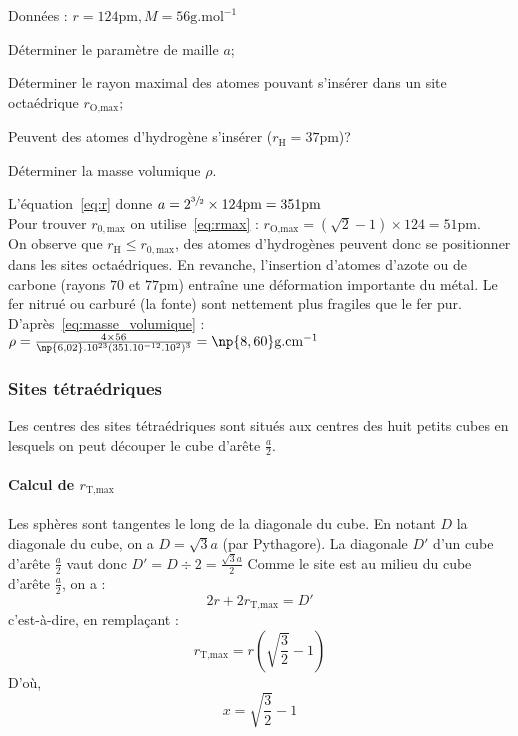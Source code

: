 \begin{ex}
    Données : $r = 124\text{pm}, M = 56\text{g.mol}^{-1}$
    \begin{compactitem}
        \item Déterminer le paramètre de maille $a$;
        \item Déterminer le rayon maximal des atomes pouvant s'insérer dans un
            site octaédrique $r_{\text{O,max}}$;
        \item Peuvent des atomes d'hydrogène s'insérer ($r_{\text{H}} = 37$pm)?
        \item Déterminer la masse volumique $\rho$.
    \end{compactitem}
    L'équation~\ref{eq:r} donne
    $a=2^{\sfrac{3}{2}} \times 124\text{pm} = 351\text{pm}$\\
    Pour trouver $r_{0,\text{max}}$ on utilise~\ref{eq:rmax} :
    $r_{\text{O,max}} = (\sqrt{2} - 1)\times 124 = 51\text{pm}$.\\
    On observe que $r_{\text{H}} \leq r_{0,\text{max}}$, des atomes
    d'hydrogènes peuvent donc se positionner dans les sites
    octaédriques. En revanche, l'insertion d'atomes d'azote ou de
    carbone (rayons $70$ et $77$pm) entraîne une déformation importante
    du métal. Le fer nitrué ou carburé (la fonte) sont nettement
    plus fragiles que le fer pur.\\
    D'après~\ref{eq:masse_volumique} :
    $\rho = \frac{4 \times 56}{\np{6,02}.10^{23}(351.10^{-12}.10^2)^3} = \np{8,60}\text{g.cm}^{-1}$
\end{ex}

\subsubsection{Sites tétraédriques}
Les centres des sites tétraédriques sont situés aux centres des
huit petits cubes en lesquels on peut découper le cube d’arête
$\frac{a}{2}$.
\paragraph{Calcul de $r_{\text{T,max}}$}
Les sphères sont tangentes le long de la diagonale du cube.
En notant $D$ la diagonale du cube, on a $D = \sqrt{3}a$
(par Pythagore). La diagonale $D'$ d'un cube d'arête $\frac{a}{2}$
vaut donc $D' = D\div 2 = \frac{\sqrt{3}a}{2}$
Comme le site est au milieu du cube d'arête $\frac{a}{2}$, on a :
\begin{equation*}
    2r + 2r_{\text{T,max}} = D'
\end{equation*}
c'est-à-dire, en remplaçant :
\begin{equation}
    \boxed{r_{\text{T,max}} = r(\sqrt{\frac{3}{2}} - 1)}\label{eq:rmax_tetra}
\end{equation}
D'où,
\begin{equation}
    x = \sqrt{\frac{3}{2}} - 1
\end{equation}


